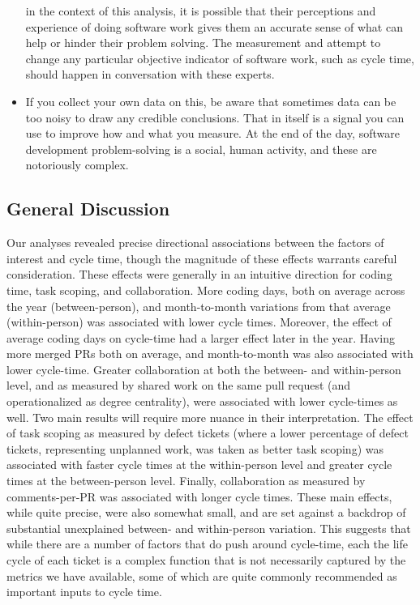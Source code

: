 \documentclass[
  sn-mathphys-ay,
]{sn-jnl}
\begin{document}
\begin{itemize}
  in the context of this analysis, it is possible that their perceptions
  and experience of doing software work gives them an accurate sense of
  what can help or hinder their problem solving. The measurement and
  attempt to change any particular objective indicator of software work,
  such as cycle time, should happen in conversation with these experts.
\item
  If you collect your own data on this, be aware that sometimes data can
  be too noisy to draw any credible conclusions. That in itself is a
  signal you can use to improve how and what you measure. At the end of
  the day, software development problem-solving is a social, human
  activity, and these are notoriously complex.
\end{itemize}

\subsection{General Discussion}\label{general-discussion}

Our analyses revealed precise directional associations between the
factors of interest and cycle time, though the magnitude of these
effects warrants careful consideration. These effects were generally in
an intuitive direction for coding time, task scoping, and collaboration.
More coding days, both on average across the year (between-person), and
month-to-month variations from that average (within-person) was
associated with lower cycle times. Moreover, the effect of average
coding days on cycle-time had a larger effect later in the year. Having
more merged PRs both on average, and month-to-month was also associated
with lower cycle-time. Greater collaboration at both the between- and
within-person level, and as measured by shared work on the same pull
request (and operationalized as degree centrality), were associated with
lower cycle-times as well. Two main results will require more nuance in
their interpretation. The effect of task scoping as measured by defect
tickets (where a lower percentage of defect tickets, representing
unplanned work, was taken as better task scoping) was associated with
faster cycle times at the within-person level and greater cycle times at
the between-person level. Finally, collaboration as measured by
comments-per-PR was associated with longer cycle times. These main
effects, while quite precise, were also somewhat small, and are set
against a backdrop of substantial unexplained between- and within-person
variation. This suggests that while there are a number of factors that
do push around cycle-time, each the life cycle of each ticket is a
complex function that is not necessarily captured by the metrics we have
available, some of which are quite commonly recommended as important
inputs to cycle time.
\end{document}
